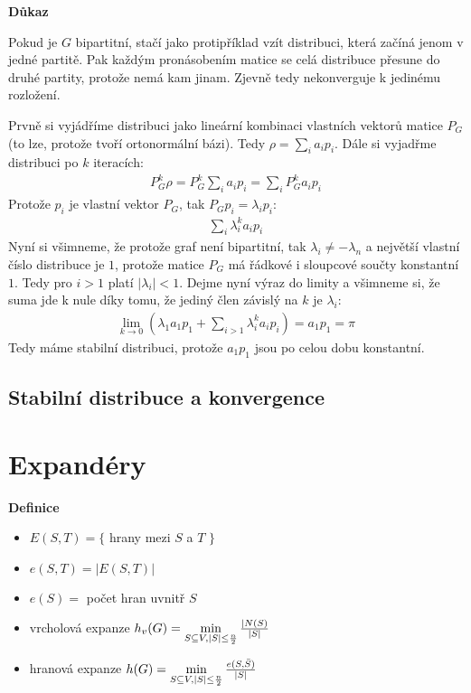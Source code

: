 \documentclass[a4paper,12pt,titlepage]{article}
\newcommand{\dk}{\smallskip\noindent\bf Důkaz\rm{} }
\newcommand{\df}{\smallskip\noindent\bf Definice\rm{} }
\begin{document}
\dk \begin{description}
	\item \uv{$\Rightarrow$} Pokud je $G$ bipartitní, stačí jako protipříklad vzít distribuci, která začíná jenom v jedné partitě. Pak každým pronásobením matice se celá distribuce přesune do druhé partity, protože nemá kam jinam. Zjevně tedy nekonverguje k jedinému rozložení.
	\item \uv{$\Leftarrow$} Prvně si vyjádříme distribuci jako lineární kombinaci vlastních vektorů matice $P_G$ (to lze, protože tvoří ortonormální bázi). Tedy $\rho = \sum_i a_ip_i$. Dále si vyjadřme distribuci po $k$ iteracích:
	\begin{align}
		P_G^k\rho = P_G^k\sum_ia_ip_i = \sum_iP_G^ka_ip_i
	\end{align}
	Protože $p_i$ je vlastní vektor $P_G$, tak $P_Gp_i = \lambda_ip_i$:
	\begin{align}
		\sum_i\lambda_i^ka_ip_i
	\end{align}
	Nyní si všimneme, že protože graf není bipartitní, tak $\lambda_i \neq -\lambda_n$ a největší vlastní číslo distribuce je $1$, protože matice $P_G$ má řádkové i sloupcové součty konstantní $1$. Tedy pro $i > 1$ platí $|\lambda_i| < 1$. Dejme nyní výraz do limity a všimneme si, že suma jde k nule díky tomu, že jediný člen závislý na $k$ je $\lambda_i$:
	\begin{align}
		\lim_{k\to 0}\left(\lambda_1a_1p_1 + \sum_{i>1}\lambda_i^ka_ip_i\right) = a_1p_1 = \pi
	\end{align}
	Tedy máme stabilní distribuci, protože $a_1p_1$ jsou po celou dobu konstantní.
\end{description}



\subsection{Stabilní distribuce a konvergence}

\section{Expandéry}

\df
\begin{itemize}
	\item $E(S,T) = \{$ hrany mezi $S$ a $T$ $\}$
	\item $e(S,T) = |E(S,T)|$
	\item $e(S) = $ počet hran uvnitř $S$
	\item vrcholová expanze $h_v(G) = \min\limits_{S\subseteq V, |S|\le {n\over 2}} {|N(S) \over |S|}$
	\item hranová expanze $h(G) = \min\limits_{S\subseteq V, |S|\le {n\over 2}} {e(S,\bar S) \over |S|}$
\end{itemize}
\end{document}
